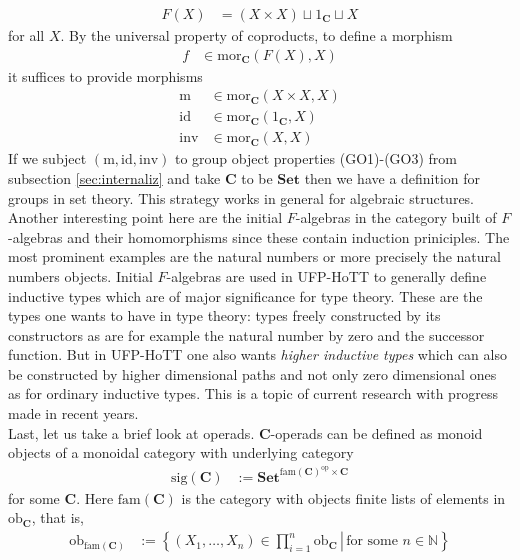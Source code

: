\begin{align*}
  F(X)
  &=
  \left(
    X
    \times
    X
  \right)
  \sqcup
  1_{\mathbf{C}}
  \sqcup
  X
\end{align*}
for all $X$. By the universal property of coproducts, to define a morphism
\begin{align*}
  f
  &\in
  \mathrm{mor}_{\mathbf{C}}(F(X),X)
\end{align*}
it suffices to provide morphisms
\begin{align*}
  \mathrm{m}
  &\in
  \mathrm{mor}_{\mathbf{C}}(X \times X,X)
  \\
  \mathrm{id}
  &\in
  \mathrm{mor}_{\mathbf{C}}(1_{\mathbf{C}},X)
  \\
  \mathrm{inv}
  &\in
  \mathrm{mor}_{\mathbf{C}}(X,X)
\end{align*}
If we subject $(\mathrm{m},\mathrm{id},\mathrm{inv})$ to group object properties (GO1)-(GO3) from subsection \ref{sec:internaliz} and take $\mathbf{C}$ to be $\mathbf{Set}$ then we have a definition for groups in set theory. This strategy works in general for algebraic structures. Another interesting point here are the initial $F$-algebras in the category built of $F$-algebras and their homomorphisms since these contain induction priniciples. The most prominent examples are the natural numbers or more precisely the natural numbers objects. Initial $F$-algebras are used in UFP-HoTT to generally define inductive types which are of major significance for type theory. These are the types one wants to have in type theory: types freely constructed by its constructors as are for example the natural number by zero and the successor function. But in UFP-HoTT one also wants \textit{higher inductive types} which can also be constructed by higher dimensional paths and not only zero dimensional ones as for ordinary inductive types. This is a topic of current research with progress made in recent years.
\\
Last, let us take a brief look at operads. $\mathbf{C}$-operads can be defined as monoid objects of a monoidal category with underlying category
\begin{align*}
  \mathrm{sig}(\mathbf{C})
  &:=
  \mathbf{Set}^{\mathrm{fam}(\mathbf{C})^{\mathrm{op}} \times \mathbf{C}}
\end{align*}
for some $\mathbf{C}$. Here $\mathrm{fam}(\mathbf{C})$ is the category with objects finite lists of elements in $\mathrm{ob}_{\mathbf{C}}$, that is,
\begin{align*}
  \mathrm{ob}_{\mathrm{fam}(\mathbf{C})}
  &:=
  \left\lbrace
    \left.
      (X_{1},\ldots,X_{n})
      \in
      \prod_{i=1}^{n}
      \mathrm{ob}_{\mathbf{C}}
    \,
    \right\vert
    \,
      \text{for some }
      n
      \in
      \mathbb{N}
  \right\rbrace
\end{align*}
